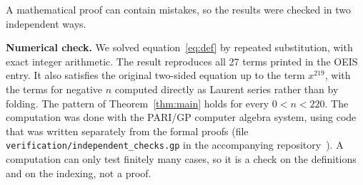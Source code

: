 \documentclass[11pt,a4paper]{article}
\theoremstyle{definition}
\theoremstyle{remark}
\newcommand{\para}[1]{\par\medskip\noindent\textbf{#1}\enspace}
\begin{document}
A mathematical proof can contain mistakes, so the results were checked in two independent ways.

\para{Numerical check.}
We solved equation~\eqref{eq:def} by repeated substitution, with exact integer arithmetic. The result reproduces all
27 terms printed in the OEIS entry. It also satisfies the original two-sided equation up to the term $x^{219}$, with
the terms for negative $n$ computed directly as Laurent series rather than by folding. The pattern of
Theorem~\ref{thm:main} holds for every $0<n<220$.
The computation was done with the PARI/GP computer algebra system, using code that was written separately from the
formal proofs (file \texttt{verification/independent\_checks.gp} in the accompanying repository~\cite{repo}).
A computation can only test finitely many cases, so it is a check on the definitions and on the indexing, not a proof.
\end{document}
